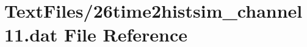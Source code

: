 \hypertarget{26time2histsim__channel11_8dat}{}\section{Text\+Files/26time2histsim\+\_\+channel11.dat File Reference}
\label{26time2histsim__channel11_8dat}

